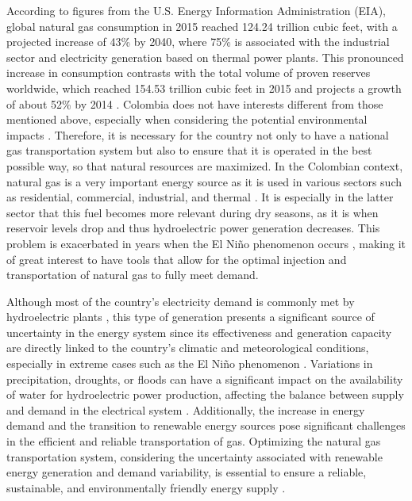     According to figures from the U.S. Energy Information Administration (EIA), global natural gas consumption in 2015 reached 124.24 trillion cubic feet, with a projected increase of 43\% by 2040, where 75\% is associated with the industrial sector and electricity generation based on thermal power plants. This pronounced increase in consumption contrasts with the total volume of proven reserves worldwide, which reached 154.53 trillion cubic feet in 2015 and projects a growth of about 52\% by 2014 \cite{eia}. Colombia does not have interests different from those mentioned above, especially when considering the potential environmental impacts \cite{ideam}. Therefore, it is necessary for the country not only to have a national gas transportation system but also to ensure that it is operated in the best possible way, so that natural resources are maximized. In the Colombian context, natural gas is a very important energy source as it is used in various sectors such as residential, commercial, industrial, and thermal \cite{creg_2021}. It is especially in the latter sector that this fuel becomes more relevant during dry seasons, as it is when reservoir levels drop and thus hydroelectric power generation decreases. This problem is exacerbated in years when the El Niño phenomenon occurs \cite{paper-col}, making it of great interest to have tools that allow for the optimal injection and transportation of natural gas to fully meet demand.

    Although most of the country's electricity demand is commonly met by hydroelectric plants \cite{xm-generacion}, this type of generation presents a significant source of uncertainty in the energy system since its effectiveness and generation capacity are directly linked to the country's climatic and meteorological conditions, especially in extreme cases such as the El Niño phenomenon \cite{fenomeno_niño}. Variations in precipitation, droughts, or floods can have a significant impact on the availability of water for hydroelectric power production, affecting the balance between supply and demand in the electrical system \cite{Ignacio_Fariza_2022}. Additionally, the increase in energy demand and the transition to renewable energy sources pose significant challenges in the efficient and reliable transportation of gas. Optimizing the natural gas transportation system, considering the uncertainty associated with renewable energy generation and demand variability, is essential to ensure a reliable, sustainable, and environmentally friendly energy supply \cite{Shan_Yu_Gong_Huang_Wen_Wang_Ren_Wang_Shi_Liu_2023}.
    



